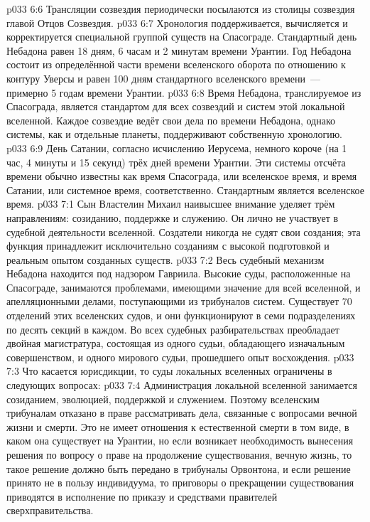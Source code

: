 \vs p033 6:6 Трансляции созвездия периодически посылаются из столицы созвездия главой Отцов Созвездия.
\vs p033 6:7 \pc Хронология поддерживается, вычисляется и корректируется специальной группой существ на Спасограде. Стандартный день Небадона равен 18 дням, 6 часам и 2 минутам времени Урантии. Год Небадона состоит из определённой части времени вселенского оборота по отношению к контуру Уверсы и равен 100 дням стандартного вселенского времени~--- примерно 5 годам времени Урантии.
\vs p033 6:8 Время Небадона, транслируемое из Спасограда, является стандартом для всех созвездий и систем этой локальной вселенной. Каждое созвездие ведёт свои дела по времени Небадона, однако системы, как и отдельные планеты, поддерживают собственную хронологию.
\vs p033 6:9 День Сатании, согласно исчислению Иерусема, немного короче (на 1 час, 4 минуты и 15 секунд) трёх дней времени Урантии. Эти системы отсчёта времени обычно известны как время Спасограда, или вселенское время, и время Сатании, или системное время, соответственно. Стандартным является вселенское время.
\vs p033 7:1 Сын Властелин Михаил наивысшее внимание уделяет трём направлениям: созиданию, поддержке и служению. Он лично не участвует в судебной деятельности вселенной. Создатели никогда не судят свои создания; эта функция принадлежит исключительно созданиям с высокой подготовкой и реальным опытом созданных существ.
\vs p033 7:2 Весь судебный механизм Небадона находится под надзором Гавриила. Высокие суды, расположенные на Спасограде, занимаются проблемами, имеющими значение для всей вселенной, и апелляционными делами, поступающими из трибуналов систем. Существует 70 отделений этих вселенских судов, и они функционируют в семи подразделениях по десять секций в каждом. Во всех судебных разбирательствах преобладает двойная магистратура, состоящая из одного судьи, обладающего изначальным совершенством, и одного мирового судьи, прошедшего опыт восхождения.
\vs p033 7:3 Что касается юрисдикции, то суды локальных вселенных ограничены в следующих вопросах:
\vs p033 7:4 Администрация локальной вселенной занимается созиданием, эволюцией, поддержкой и служением. Поэтому вселенским трибуналам отказано в праве рассматривать дела, связанные с вопросами вечной жизни и смерти. Это не имеет отношения к естественной смерти в том виде, в каком она существует на Урантии, но если возникает необходимость вынесения решения по вопросу о праве на продолжение существования, вечную жизнь, то такое решение должно быть передано в трибуналы Орвонтона, и если решение принято не в пользу индивидуума, то приговоры о прекращении существования приводятся в исполнение по приказу и средствами правителей сверхправительства.
